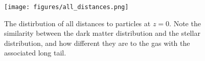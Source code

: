 \begin{figure}
    \centering
    \texttt{[image: figures/all\_distances.png]}
    \caption{The distirbution of all distances to particles at $z=0$. Note the similarity between the dark matter distribution and the stellar distribution, and how different they are to the gas with the associated long tail.}
    \label{fig:alldistances}
\end{figure}


